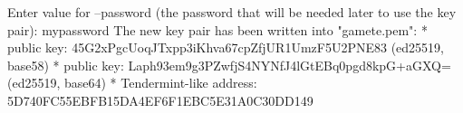 \begin{shellbox}\begin{ttlst}
Enter value for --password (the password that will be needed later to use the key pair): mypassword
The new key pair has been written into "gamete.pem":
* public key: 45G2xPgcUoqJTxpp3iKhva67cpZfjUR1UmzF5U2PNE83 (ed25519, base58)
* public key: Laph93em9g3PZwfjS4NYNfJ4lGtEBq0pgd8kpG+aGXQ= (ed25519, base64)
* Tendermint-like address: 5D740FC55EBFB15DA4EF6F1EBC5E31A0C30DD149
\end{ttlst}\end{shellbox}
